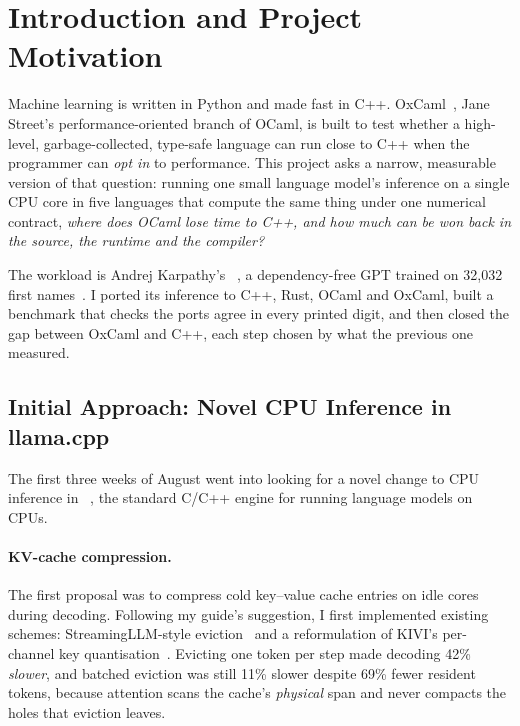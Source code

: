 \section{Introduction and Project Motivation}
\label{sec:intro}

Machine learning is written in Python and made fast in C++. OxCaml~\cite{oxcaml},
Jane Street's performance-oriented branch of OCaml, is built to test whether a
high-level, garbage-collected, type-safe language can run close to C++ when the
programmer can \emph{opt in} to performance. This project asks a narrow,
measurable version of that question: running one small language model's
inference on a single CPU core in five languages that compute the same thing
under one numerical contract, \emph{where does OCaml lose time to C++, and how much can be won
back in the source, the runtime and the compiler?}

The workload is Andrej Karpathy's ~\cite{karpathy_microgpt},
a dependency-free GPT trained on 32,032 first names~\cite{karpathy_makemore}.
I ported its inference to C++, Rust, OCaml and OxCaml, built a benchmark that
checks the ports agree in every printed digit, and then closed the gap between
OxCaml and C++, each step chosen by what the previous one measured.

\subsection{Initial Approach: Novel CPU Inference in llama.cpp}
\label{sec:intro-llamacpp}

The first three weeks of August went into looking for a novel change to CPU
inference in ~\cite{llamacpp}, the standard C/C++ engine for
running language models on CPUs.

\paragraph{KV-cache compression.} The first proposal was to compress cold
key--value cache entries on idle cores during decoding. Following my guide's
suggestion, I first implemented existing schemes: StreamingLLM-style
eviction~\cite{xiao2024streamingllm} and a reformulation of KIVI's per-channel
key quantisation~\cite{liu2024kivi}. Evicting one token per step made decoding
42\% \emph{slower}, and batched eviction was still 11\% slower despite 69\%
fewer resident tokens, because attention scans the cache's \emph{physical} span
and  never compacts the holes that eviction leaves.

